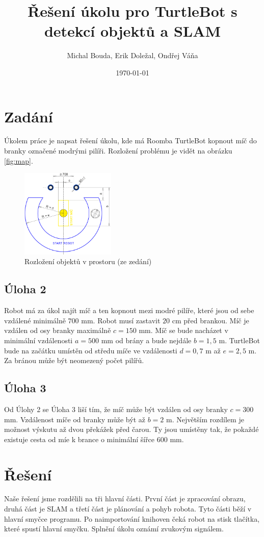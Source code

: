 \documentclass[a4paper,12pt]{article}
\title{Řešení úkolu pro TurtleBot s detekcí objektů a SLAM}
\author{Michal Bouda, Erik Doležal, Ondřej Váňa}
\date{\today}
\begin{document}
\maketitle

\tableofcontents

\section{Zadání}
Úkolem práce je napsat řešení úkolu, kde má Roomba TurtleBot kopnout míč do branky označené modrými pilíři.
Rozložení problému je vidět na obrázku \eqref{fig:map}.
\begin{figure}[H]
\centering
\includegraphics[width=0.4\textwidth]{pictures/map.png}
\caption{Rozložení objektů v prostoru (ze zedání)}
\label{fig:map}	
\end{figure}

\subsection{Úloha 2}
Robot má za úkol najít míč a ten kopnout mezi modré pilíře, které jsou od sebe vzdálené minimálně $700$ mm. Robot musí zastavit $20$ cm před brankou. Míč je vzdálen od osy branky maximálně $c = 150$ mm.
Míč se bude nacházet v minimální vzdálenosti $a = 500$ mm od brány a bude nejdále $b = 1,5$ m. TurtleBot bude na začátku umístěn od středu míče ve vzdálenosti $d = 0,7$ m až $e = 2,5$ m.
Za bránou může být neomezený počet pilířů.

\subsection{Úloha 3}
Od Úlohy 2 se Úloha 3 liší tím, že míč může být vzdálen od osy branky $c = 300$ mm. Vzdálenost míče od branky může být až $b = 2$ m.
Největším rozdílem je možnost výskutu až dvou překážek před čarou. Ty jsou umístěny tak, že pokaždé existuje cesta od míe k brance o minimální šířce $600$ mm.

\section{Řešení}
Naše řešení jsme rozdělili na tři hlavní části. První část je zpracování obrazu, druhá část je SLAM a třetí část je plánování a pohyb robota. Tyto části běží v hlavní smyčce programu. 
Po naimportování knihoven čeká robot na stisk tlačítka, které spustí hlavní smyčku. Splnění úkolu oznámí zvukovým signálem.
\end{document}
